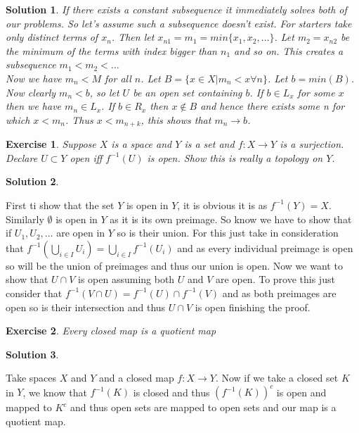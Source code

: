 \documentclass[11pt,a4paper]{article}
\newtheorem{Ex}{Exercise}
\newtheorem{Sol}{Solution}
\begin{document}
\begin{Sol}
	\noindent If there exists a constant subsequence it immediately solves both of our problems. So let's assume such a subsequence doesn't exist. For starters take only distinct terms of $x_n$. Then let $x_{n1} =m_1 = min\{x_1,x_2,\dots \}$. Let $m_2 = x_{n2}$ be the minimum of the terms with index bigger than $n_1$ and so on. This creates a subsequence $m_1 < m_2 < \dots$  \\ 
	Now we have $m_n < M$ for all $n$. Let $B = \{ x \in X|m_n < x \forall n \}$. Let $b=min(B)$. Now clearly $m_n < b$, so let $U$ be an open set containing $b$. If $b\in L_x$ for some $x$ then we have $m_n \in L_x$. If $b \in R_x$ then $x\not \in B$ and hence there exists some n for which $x<m_n$. Thus $x<m_{n+k}$, this shows that $m_n \rightarrow b$.
\end{Sol}

\begin{Ex}
	Suppose $X$ is a space and $Y$ is a set and $f : X \rightarrow Y$ is a surjection. Declare $U \subset Y$ open iff $f^{-1}(U)$ is open. Show this is really a topology on $Y$.  
\end{Ex}
\begin{Sol}\end{Sol}
\noindent	First ti show that the set $Y$ is open in $Y$, it is obvious it is as $f^{-1}(Y)=X$. Similarly $\emptyset$ is open in $Y$ as it is its own preimage. So know we have to show that if $U_1, U_2, \dots $ are open in $Y$ so is their union. For this just take in consideration that $f^{-1}(\bigcup_{i \in I}U_i) = \bigcup_{i \in I} f^{-1}(U_i)$ and as every individual preimage is open so will be the union of preimages and thus our union is open. Now we want to show that $U \cap V$ is open assuming both $U$ and $V$ are open. To prove this just consider that $f^{-1}(V \cap U) = f^{-1}(U) \cap f^{-1}(V)$ and as both preimages are open so is their intersection and thus $U \cap V$ is open finishing the proof.

\begin{Ex}
	Every closed map is a quotient map
\end{Ex}
\begin{Sol}\end{Sol}
\noindent Take spaces $X$ and $Y$ and a closed map $f: X \rightarrow Y$. Now if we take a closed set $K$ in $Y$, we know that $f^{-1}(K)$ is closed and thus $(f^{-1}(K))^c$ is open and mapped to $K^c$ and thus open sets are mapped to open sets and our map is a quotient map. 
\end{document}
